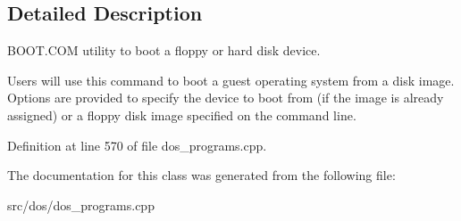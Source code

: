 \subsection{Detailed Description}
B\-O\-O\-T.\-C\-O\-M utility to boot a floppy or hard disk device. 

Users will use this command to boot a guest operating system from a disk image. Options are provided to specify the device to boot from (if the image is already assigned) or a floppy disk image specified on the command line. 

Definition at line 570 of file dos\-\_\-programs.\-cpp.



The documentation for this class was generated from the following file\-:\begin{DoxyCompactItemize}
\item 
src/dos/dos\-\_\-programs.\-cpp\end{DoxyCompactItemize}
